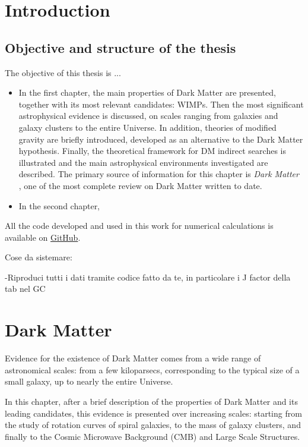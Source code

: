 \chapter{Introduction}
\section{Objective and structure of the thesis}
The objective of this thesis is ...
\begin{itemize}
    \item In the first chapter, the main properties of Dark Matter are presented, together with its most relevant candidates: WIMPs. Then the most significant astrophysical evidence is discussed, on scales ranging from galaxies and galaxy clusters to the entire Universe. In addition, theories of modified gravity are briefly introduced, developed as an alternative to the Dark Matter hypothesis. Finally, the theoretical framework for DM indirect searches is illustrated and the main astrophysical environments investigated are described.
          The primary source of information for this chapter is \emph{Dark Matter} \cite{cirelli2025darkmatter}, one of the most complete review on Dark Matter written to date.
    \item In the second chapter,
\end{itemize}

All the code developed and used in this work for numerical calculations is available on \href{https://github.com/IvanDalena/Bachelor-thesis}{GitHub}.
 
Cose da sistemare:


-Riproduci tutti i dati tramite codice fatto da te, in particolare i J factor della tab nel GC






\chapter{Dark Matter}

Evidence for the existence of Dark Matter comes from a wide range of astronomical scales: from a few kiloparsecs, corresponding to the typical size of a small galaxy, up to nearly the entire Universe.

In this chapter, after a brief description of the properties of Dark Matter and its leading candidates, this evidence is presented over increasing scales: starting from the study of rotation curves of spiral galaxies, to the mass of galaxy clusters, and finally to the Cosmic Microwave Background (CMB) and Large Scale Structures. 

